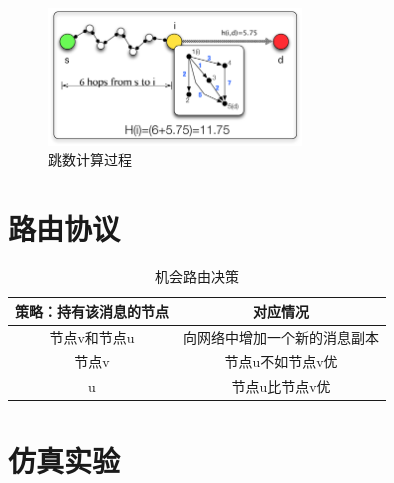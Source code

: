 \begin{figure}[bt]
  \centering
  \includegraphics[width=0.6\textwidth]{paper-HCH/heuristic}
  \caption{跳数计算过程}
  \label{fig:heuristic}
\end{figure}

\section{路由协议}
\label{chap5:路由协议}

\begin{table}[bt]
  \caption{机会路由决策}
  \label{tab:chap5_routing}
  \centering
  \begin{tabular}{cc}
  \hline
   \textbf{策略：持有该消息的节点} & \textbf{对应情况}  \\
    \hline
    节点v和节点u & 向网络中增加一个新的消息副本\\
    节点v & 节点u不如节点v优\\
    u & 节点u比节点v优\\
    \hline
  \end{tabular}
\end{table}

\section{仿真实验}
\label{chap5:仿真实验}

